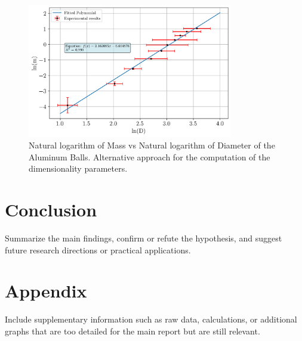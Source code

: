 \documentclass[a4paper,12pt]{article}
\begin{document}
\begin{figure}[h!]
    \centering
    \includegraphics[width = 0.8\textwidth]{ln_mass_vs_ln_diameter.png}
    \caption{Natural logarithm of Mass vs Natural logarithm of Diameter of the Aluminum Balls. Alternative approach for the computation of the dimensionality parameters.}
    \label{fig:ln_mass_vs_ln_diameter}
\end{figure}

\section{Conclusion}\label{sec:conclusion}
Summarize the main findings, confirm or refute the hypothesis, and suggest future research directions or practical applications.

\section{Appendix}
Include supplementary information such as raw data, calculations, or additional graphs that are too detailed for the main report but are still relevant.

\printbibliography
\end{document}
